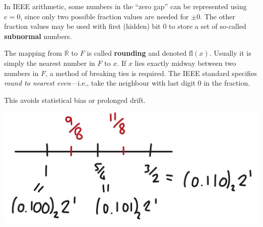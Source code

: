 \documentclass[
  letterpaper,
  DIV=11,
  numbers=noendperiod]{scrreprt}
\begin{document}
\begin{tcolorbox}[enhanced jigsaw, toptitle=1mm, breakable, colbacktitle=quarto-callout-note-color!10!white, colback=white, opacitybacktitle=0.6, rightrule=.15mm, bottomrule=.15mm, left=2mm, arc=.35mm, bottomtitle=1mm, title=\textcolor{quarto-callout-note-color}{\faInfo}\hspace{0.5em}{Note}, titlerule=0mm, toprule=.15mm, leftrule=.75mm, opacityback=0, colframe=quarto-callout-note-color-frame, coltitle=black]

In IEEE arithmetic, some numbers in the ``zero gap'' can be represented
using \(e=0\), since only two possible fraction values are needed for
\(\pm 0\). The other fraction values may be used with first (hidden) bit
0 to store a set of so-called \textbf{subnormal} numbers.

\end{tcolorbox}

The mapping from \(\mathbb{R}\) to \(F\) is called \textbf{rounding} and
denoted \(\mathrm{fl}(x)\). Usually it is simply the nearest number in
\(F\) to \(x\). If \(x\) lies exactly midway between two numbers in
\(F\), a method of breaking ties is required. The IEEE standard
specifies \emph{round to nearest even}---i.e., take the neighbour with
last digit 0 in the fraction.

\begin{tcolorbox}[enhanced jigsaw, toptitle=1mm, breakable, colbacktitle=quarto-callout-note-color!10!white, colback=white, opacitybacktitle=0.6, rightrule=.15mm, bottomrule=.15mm, left=2mm, arc=.35mm, bottomtitle=1mm, title=\textcolor{quarto-callout-note-color}{\faInfo}\hspace{0.5em}{Note}, titlerule=0mm, toprule=.15mm, leftrule=.75mm, opacityback=0, colframe=quarto-callout-note-color-frame, coltitle=black]

This avoids statistical bias or prolonged drift.

\end{tcolorbox}

\begin{center}
\includegraphics[width=0.7\linewidth,height=\textheight,keepaspectratio]{im/fp2.jpg}
\end{center}
\end{document}
